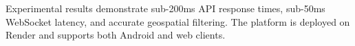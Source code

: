 \documentclass[14pt,a4paper]{extreport}
\begin{document}
Experimental results demonstrate sub-200ms API response times, sub-50ms WebSocket latency, and accurate geospatial filtering. The platform is deployed on Render and supports both Android and web clients.

\tableofcontents
{}

\listoffigures
{}

\listoftables
{}













\vfill
\end{document}
